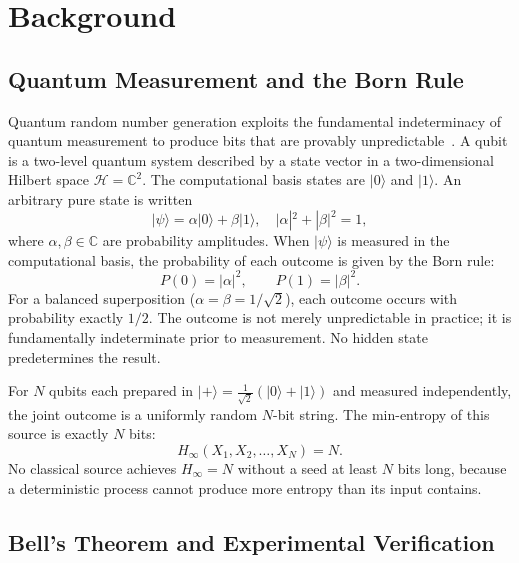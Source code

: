\documentclass[journal]{IEEEtran}
\begin{document}
\section{Background}
\label{sec:background}

\subsection{Quantum Measurement and the Born Rule}
\label{subsec:born}

Quantum random number generation exploits the fundamental indeterminacy of quantum measurement to produce bits that are provably unpredictable~\cite{ma2016qrng, herrero2017qrng}. A qubit is a two-level quantum system described by a state vector in a two-dimensional Hilbert space $\mathcal{H} = \mathbb{C}^2$. The computational basis states are $|0\rangle$ and $|1\rangle$. An arbitrary pure state is written
\begin{equation}
|\psi\rangle = \alpha|0\rangle + \beta|1\rangle, \quad |\alpha|^2 + |\beta|^2 = 1,
\label{eq:qubit}
\end{equation}
where $\alpha, \beta \in \mathbb{C}$ are probability amplitudes. When $|\psi\rangle$ is measured in the computational basis, the probability of each outcome is given by the Born rule:
\begin{equation}
P(0) = |\alpha|^2, \qquad P(1) = |\beta|^2.
\label{eq:born}
\end{equation}
For a balanced superposition ($\alpha = \beta = 1/\sqrt{2}$), each outcome occurs with probability exactly $1/2$. The outcome is not merely unpredictable in practice; it is fundamentally indeterminate prior to measurement. No hidden state predetermines the result.

For $N$ qubits each prepared in $|{+}\rangle = \frac{1}{\sqrt{2}}(|0\rangle + |1\rangle)$ and measured independently, the joint outcome is a uniformly random $N$-bit string. The min-entropy of this source is exactly $N$ bits:
\begin{equation}
H_\infty(X_1, X_2, \ldots, X_N) = N.
\label{eq:minentropy}
\end{equation}
No classical source achieves $H_\infty = N$ without a seed at least $N$ bits long, because a deterministic process cannot produce more entropy than its input contains.

\subsection{Bell's Theorem and Experimental Verification}
\label{subsec:bell}
\end{document}
